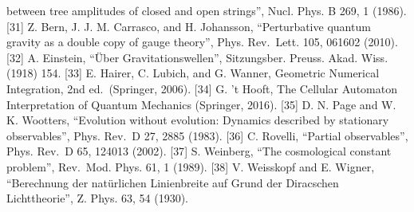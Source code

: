 \documentclass[
]{article}
\begin{document}
between tree amplitudes of closed and open strings'', Nucl. Phys. B 269,
1 (1986). {[}31{]} Z. Bern, J. J. M. Carrasco, and H. Johansson,
``Perturbative quantum gravity as a double copy of gauge theory'', Phys.
Rev.~Lett. 105, 061602 (2010). {[}32{]} A. Einstein, ``Über
Gravitationswellen'', Sitzungsber. Preuss. Akad. Wiss. (1918) 154.
{[}33{]} E. Hairer, C. Lubich, and G. Wanner, Geometric Numerical
Integration, 2nd ed.~(Springer, 2006). {[}34{]} G. 't Hooft, The
Cellular Automaton Interpretation of Quantum Mechanics (Springer, 2016).
{[}35{]} D. N. Page and W. K. Wootters, ``Evolution without evolution:
Dynamics described by stationary observables'', Phys. Rev.~D 27, 2885
(1983). {[}36{]} C. Rovelli, ``Partial observables'', Phys. Rev.~D 65,
124013 (2002). {[}37{]} S. Weinberg, ``The cosmological constant
problem'', Rev.~Mod. Phys. 61, 1 (1989). {[}38{]} V. Weisskopf and E.
Wigner, ``Berechnung der natürlichen Linienbreite auf Grund der
Diracschen Lichttheorie'', Z. Phys. 63, 54 (1930).
\end{document}
